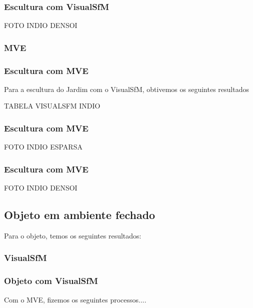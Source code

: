 \documentclass[table, usenames, svgnames, xcolor=dvipsnames]{beamer}
\begin{document}
\begin{frame}
\frametitle{\textbf{Escultura com VisualSfM}}
FOTO INDIO DENSOI
\end{frame}

\subsubsection{MVE}
\begin{frame}
\frametitle{\textbf{Escultura com MVE}}
	Para a escultura do Jardim com o VisualSfM, obtivemos os seguintes resultados
	
	TABELA VISUALSFM INDIO
\end{frame}

\begin{frame}
\frametitle{\textbf{Escultura com MVE}}
	FOTO INDIO ESPARSA
\end{frame}

\begin{frame}
\frametitle{\textbf{Escultura com MVE}}
FOTO INDIO DENSOI
\end{frame}

\subsection{Objeto em ambiente fechado}

\begin{frame}
	Para o objeto, temos os seguintes resultados:
\end{frame}

\subsubsection{VisualSfM}

\begin{frame}
\frametitle{\textbf{Objeto com VisualSfM}}
	Com o MVE, fizemos os seguintes processos....
\end{frame}

\end{document}
